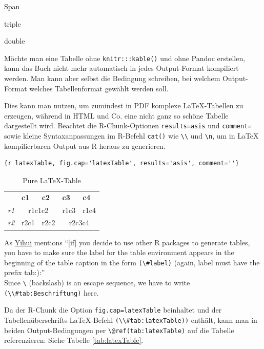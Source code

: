 \documentclass[]{book}
\theoremstyle{definition}
\theoremstyle{definition}
\theoremstyle{remark}
\begin{document}
\textbar{} Span

triple

double

Möchte man eine Tabelle ohne \texttt{knitr:::kable()} und ohne Pandoc
erstellen, kann das Buch nicht mehr automatisch in jedes Output-Format
kompiliert werden. Man kann aber selbst die Bedingung schreiben, bei
welchem Output-Format welches Tabellenformat gewählt werden soll.

Dies kann man nutzen, um zumindest in PDF komplexe LaTeX-Tabellen zu
erzeugen, während in HTML und Co. eine nicht ganz so schöne Tabelle
dargestellt wird. Beachtet die R-Chunk-Optionen
\texttt{results=\textquotesingle{}asis} und
\texttt{comment=\textquotesingle{}\textquotesingle{}} sowie kleine
Syntaxanpassungen im R-Befehl \texttt{cat()} wie
\texttt{\textbackslash{}\textbackslash{}} und
\texttt{\textbackslash{}n}, um in LaTeX kompilierbaren Output aus R
heraus zu generieren.

\begin{verbatim}
{r latexTable, fig.cap='latexTable', results='asis', comment=''}
\end{verbatim}

\begin{table}[]
\centering
\caption{\label{tab:latexTable} Pure LaTeX-Table}
\label{latexTable}
\begin{tabular}{lllll}
            & \textbf{c1}  & \textbf{c2} & \textbf{c3}  & \textbf{c4} \\
\textit{r1} & \multicolumn{2}{c}{r1c1c2} & r1c3         & r1c4        \\
\textit{r2} & r2c1         & r2c2        & \multicolumn{2}{c}{r2c3c4}
\end{tabular}
\end{table}

As \href{https://bookdown.org/yihui/bookdown/tables.html}{Yihui}
mentions ``{[}if{]} you decide to use other R packages to generate
tables, you have to make sure the label for the table environment
appears in the beginning of the table caption in the form
\texttt{(\textbackslash{}\#label)} (again, label must have the prefix
tab:):''\\
Since \texttt{\textbackslash{}} (backslash) is an escape sequence, we
have to write
\texttt{(\textbackslash{}\textbackslash{}\#tab:Beschriftung)} here.

Da der R-Chunk die Option
\texttt{fig.cap=\textquotesingle{}latexTable\textquotesingle{}}
beinhaltet und der Tabellenüberschrifts-LaTeX-Befehl
\texttt{(\textbackslash{}\textbackslash{}\#tab:latexTable))} enthält,
kann man in beiden Output-Bedingungen per
\texttt{\textbackslash{}@ref(tab:latexTable)} auf die Tabelle
referenzieren: Siehe Tabelle \ref{tab:latexTable}.
\end{document}
